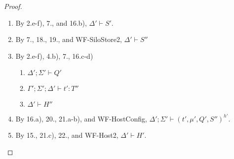 \documentclass{article}
\theoremstyle{definition}
\begin{document}
\begin{proof}
\begin{itemize}
\begin{enumerate}
\item By 2.e-f), 7., and 16.b), $\Delta' \vdash S'$.
\item By 7., 18., 19., and WF-SiloStore2, $\Delta' \vdash S''$
\item By 2.e-f), 4.b), 7., 16.c-d)
  \begin{enumerate}[label=(\alph*)]
  \item $\Delta' ; \Sigma' \vdash Q'$
  \item $\Gamma' ; \Sigma' ; \Delta' \vdash t' : T''$
  \item $\Delta' \vdash H''$
  \end{enumerate}
\item By 16.a), 20., 21.a-b), and WF-HostConfig, $\Delta' ; \Sigma' \vdash (t', \mu', Q', S'')^{h'}$.
\item By 15., 21.c), 22., and WF-Host2, $\Delta' \vdash H'$.
\end{enumerate}


\end{itemize}
\end{proof}
\end{document}

